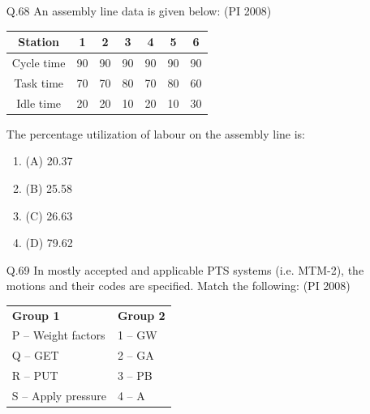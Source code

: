 \documentclass[journal,12pt,onecolumn]{IEEEtran}
\theoremstyle{remark}
\begin{document}
\begin{enumerate}
Using FCFS dispatching rule, the average lateness is:  

\begin{multicols}{4}
    \begin{enumerate}[label=(\Alph*)]
\item 2.0 
\item1.5 
\item1.0 
\item0.5
 \end{enumerate}
\end{multicols}
\vspace{1cm}
\vspace{0.5cm}
\item[\textnormal{Q.68}]
An assembly line data is given below:
\hfill{(PI 2008)}
\begin{center}
\begin{tabular}{|c|c|c|c|c|c|c|}
\hline
\textbf{Station} & 1 & 2 & 3 & 4 & 5 & 6 \\
\hline
Cycle time & 90 & 90 & 90 & 90 & 90 & 90 \\
Task time  & 70 & 70 & 80 & 70 & 80 & 60 \\
Idle time  & 20 & 20 & 10 & 20 & 10 & 30 \\
\hline
\end{tabular}
\end{center}

The percentage utilization of labour on the assembly line is:  

\begin{multicols}{4}
    \begin{enumerate}[label=(\Alph*)]
\item (A) 20.37
\item (B) 25.58 
\item (C) 26.63  
\item (D) 79.62
 \end{enumerate}
\end{multicols}
\vspace{1cm}
\item[\textnormal{Q.69}]
In mostly accepted and applicable PTS systems (i.e. MTM-2), the motions and their codes are specified. Match the following:
\hfill{(PI 2008)}\\
\vspace{1cm}
\begin{tabular}{ll}
\textbf{Group 1} & \textbf{Group 2} \\
P -- Weight factors & 1 -- GW \\
Q -- GET            & 2 -- GA \\
R -- PUT            & 3 -- PB \\
S -- Apply pressure & 4 -- A \\
\end{tabular}


\end{enumerate}
\end{document}
